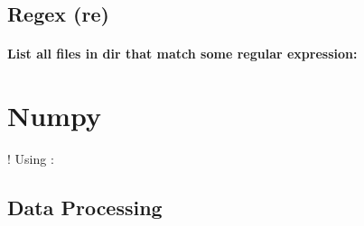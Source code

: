\documentclass[10pt]{article}
\begin{document}
\subsection{Regex (re)}

\paragraph{List all files in dir that match some regular expression:}
\begin{description}
  \setlength\itemsep{-5pt} 
  \item {}
  \item {}
\end{description}


\newpage
\section{Numpy}
! Using :

\subsection{Data Processing}
\begin{description}
  \setlength\itemsep{1pt}
  \item[Import data from csv file:] 
\end{description}
\end{document}
